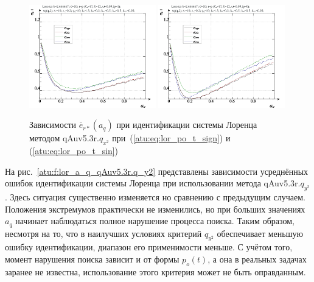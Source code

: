 \begin{figure}[h!]
  \centerline{
    \includegraphics[width=0.49\textwidth]{p/cha/lor/qAuv5.3r/lor_qAuv5_3r_qx2-p_a_q_e_sign.png}
    \hfill
    \includegraphics[width=0.49\textwidth]{p/cha/lor/qAuv5.3r/lor_qAuv5_3r_qx2-p_a_q_e_sin.png}
  }
  \caption{Зависимости $\overline{e}_{r*}(a_q)$ при идентификации системы Лоренца методом qAuv5.3r.$q_{x^2}$
   при~(\ref{atu:eq:lor_po_t_sign}) и (\ref{atu:eq:lor_po_t_sin})}
  \label{atu:f:lor_a_q_qAuv5.3r.q_x2}
\end{figure}


На рис.~\ref{atu:f:lor_a_q_qAuv5.3r.q_y2} представлены зависимости
усреднённых ошибок идентификации системы Лоренца при использовании метода qAuv5.3r.$q_{y^2}$.
Здесь ситуация существенно изменяется но сравнению с предыдущим случаем.
Положения экстремумов практически не изменились, но
при больших значениях $a_q$ начинает наблюдаться полное нарушение
процесса поиска. Таким образом, несмотря на то,
что в наилучших условиях критерий $q_{y^2}$ обеспечивает меньшую
ошибку идентификации, диапазон его применимости меньше. С учётом
того, момент нарушения поиска зависит и от формы $p_o(t)$,
а она в реальных задачах заранее не известна, использование этого критерия может
не быть оправданным.

